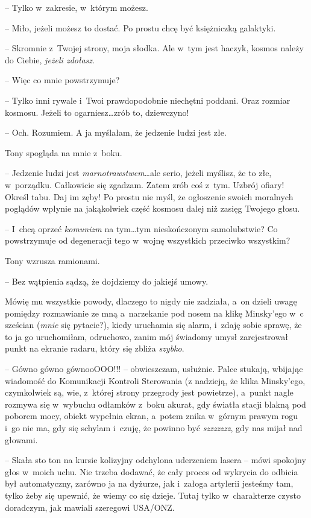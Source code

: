 \documentclass[oneside,polish,11pt,sfheadings]{mwbk}
\begin{document}
-- Tylko w~zakresie, w~którym możesz.

-- Miło, jeżeli możesz to dostać. Po prostu chcę być księżniczką
galaktyki.

-- Skromnie z~Twojej strony, moja słodka. Ale w~tym jest haczyk, kosmos
należy do Ciebie, \textit{jeżeli zdołasz}.

-- Więc co mnie powstrzymuje?

-- Tylko inni rywale i~Twoi prawdopodobnie niechętni poddani. Oraz
rozmiar kosmosu. Jeżeli to ogarniesz\ldots  zrób to, dziewczyno!

-- Och. Rozumiem. A ja myślałam, że jedzenie ludzi jest złe.

Tony spogląda na mnie z~boku. 

-- Jedzenie ludzi jest
\textit{marnotrawstwem}\ldots  ale serio, jeżeli myślisz, że to złe, w~porządku. Całkowicie się zgadzam. Zatem zrób coś z~tym. Uzbrój ofiary!
Określ tabu. Daj im zęby! Po prostu nie myśl, że ogłoszenie swoich
moralnych poglądów wpłynie na jakąkolwiek część kosmosu dalej niż zasięg
Twojego głosu.

-- I~chcą oprzeć \textit{komunizm} na tym\ldots  tym nieskończonym
samolubstwie? Co powstrzymuje od degeneracji tego w~wojnę wszystkich
przeciwko wszystkim?

Tony wzrusza ramionami. 

-- Bez wątpienia sądzą, że dojdziemy do jakiejś
umowy.

Mówię mu wszystkie powody, dlaczego to nigdy nie zadziała, a~on dzieli
uwagę pomiędzy rozmawianie ze mną a~narzekanie pod nosem na klikę
Minsky'ego w~c sześcian (\textit{mnie }się pytacie?), kiedy uruchamia się
alarm, i~zdaję sobie sprawę, że to ja go uruchomiłam, odruchowo, zanim
mój świadomy umysł zarejestrował punkt na ekranie radaru, który się
zbliża \textit{szybko}.

-- Gówno gówno gównooOOO!!! -- obwieszczam, usłużnie. Palce stukają,
wbijając wiadomość do Komunikacji Kontroli Sterowania (z nadzieją, że
klika Minsky'ego, czymkolwiek są, wie, z~której strony przegrody jest
powietrze), a~punkt nagle rozmywa się w~wybuchu odłamków z~boku akurat,
gdy światła stacji blakną pod poborem mocy, obiekt wypełnia ekran, a~potem znika w~górnym prawym rogu i~go nie ma, gdy się schylam i~czuję,
że powinno być \textit{szzzzzzz}, gdy nas mijał nad głowami.

-- Skała sto ton na kursie kolizyjny odchylona uderzeniem lasera -- mówi
spokojny głos w~moich uchu. Nie trzeba dodawać, że cały proces od
wykrycia do odbicia był automatyczny, zarówno ja na dyżurze, jak i~załoga artylerii jesteśmy tam, tylko żeby się upewnić, że wiemy co się dzieje.
Tutaj tylko w~charakterze czysto doradczym, jak mawiali szeregowi
USA/ONZ.
\end{document}
